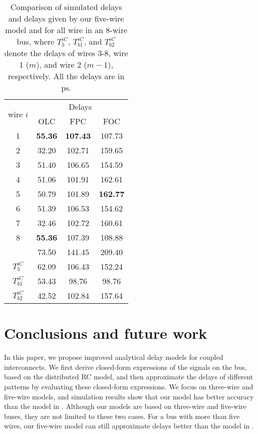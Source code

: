 \documentclass[10pt,journal]{IEEEtran}
\begin{document}
\begin{table}[!t]
\caption{Comparison of simulated delays and delays given by our five-wire model and \cite{Sot01} for all wire in an 8-wire bus, where $T^{iC}_5$, $T^{iC}_{b1}$, and $T^{iC}_{b2}$ denote the delays of wires 3-8, wire 1 ($m$), and wire 2 ($m-1$), respectively. All the delays are in $\mathrm{ps}$.}\label{tab:8wire}
\begin{center}
\begin{tabular}{|c|c|c|c|}
\hline
\multirow{2}{*}{wire $i$} & \multicolumn{3}{c|}{Delays}\\
\cline{2-4}
& OLC & FPC& FOC\\
\hline
1 & \textbf{55.36} & \textbf{107.43} & 107.73\\
\hline
2 & 32.20 & 102.71 & 159.65\\
\hline
3 & 51.40 & 106.65 & 154.59\\
\hline
4 & 51.06 & 101.91 & 162.61\\
\hline
5 & 50.79 & 101.89 & \textbf{162.77}\\
\hline
6 & 51.39 & 106.53 & 154.62\\
\hline
7 & 32.46 & 102.72 & 160.61\\
\hline
8 & \textbf{55.36} & 107.39 & 108.88\\
\hline
\hline
\cite{Sot02} & 73.50 & 141.45 & 209.40\\
\hline
$T^{iC}_5$ & 62.09 & 106.43 & 152.24\\
\hline
$T^{iC}_{b1}$ & 53.43 & 98.76 & 98.76 \\
\hline
$T^{iC}_{b2}$ & 42.52 & 102.84 & 157.64\\
\hline
\end{tabular}
\end{center}
\end{table}












\section{Conclusions and future work}\label{sec:conclusion}
In this paper, we propose improved analytical delay models for coupled interconnects. We first derive closed-form expressions of the signals on the bus, based on the distributed RC model, and then approximate the delays of different patterns by evaluating these closed-form expressions. We focus on three-wire and five-wire models, and simulation results show that our model has better accuracy than the model in \cite{Sot01}. Although our models are based on three-wire and five-wire buses, they are not limited to these two cases. For a bus with more than five wires, our five-wire model can still approximate delays better than the model in \cite{Sot01}. 



\end{document}
